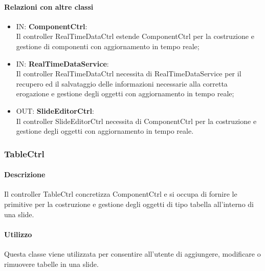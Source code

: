 	\paragraph{Relazioni con altre classi}
	\begin{itemize}
 	\item IN: \textbf{ComponentCtrl}:\\
	 	Il controller RealTimeDataCtrl estende ComponentCtrl per la costruzione e gestione di componenti con aggiornamento in tempo reale;
	\item IN: \textbf{RealTimeDataService}:\\
		Il controller RealTimeDataCtrl necessita di RealTimeDataService per il recupero ed il salvataggio delle informazioni necessarie alla corretta erogazione e gestione degli oggetti con aggiornamento in tempo reale;
	\item OUT: \textbf{SlideEditorCtrl}:\\
		Il controller SlideEditorCtrl necessita di ComponentCtrl per la costruzione e gestione degli oggetti con aggiornamento in tempo reale. 	
	\end{itemize}

\newpage
\subsubsection{TableCtrl}
   \paragraph{Descrizione}
	Il controller TableCtrl concretizza ComponentCtrl e si occupa di fornire le primitive per la costruzione e gestione degli oggetti di tipo tabella all'interno di una slide.
		
	\paragraph{Utilizzo}
	Questa classe viene utilizzata per consentire all'utente di aggiungere, modificare o rimuovere tabelle in una slide.
	
